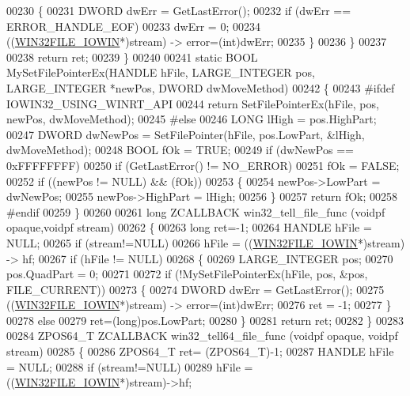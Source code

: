 \begin{DoxyCode}
00230         \{
00231             DWORD dwErr = GetLastError();
00232             \textcolor{keywordflow}{if} (dwErr == ERROR\_HANDLE\_EOF)
00233                 dwErr = 0;
00234             ((\hyperlink{struct_w_i_n32_f_i_l_e___i_o_w_i_n}{WIN32FILE\_IOWIN}*)stream) -> error=(int)dwErr;
00235         \}
00236     \}
00237 
00238     \textcolor{keywordflow}{return} ret;
00239 \}
00240 
00241 \textcolor{keyword}{static} BOOL MySetFilePointerEx(HANDLE hFile, LARGE\_INTEGER pos, LARGE\_INTEGER *newPos,  DWORD dwMoveMethod)
00242 \{
00243 \textcolor{preprocessor}{#ifdef IOWIN32\_USING\_WINRT\_API}
00244     \textcolor{keywordflow}{return} SetFilePointerEx(hFile, pos, newPos, dwMoveMethod);
00245 \textcolor{preprocessor}{#else}
00246     LONG lHigh = pos.HighPart;
00247     DWORD dwNewPos = SetFilePointer(hFile, pos.LowPart, &lHigh, dwMoveMethod);
00248     BOOL fOk = TRUE;
00249     \textcolor{keywordflow}{if} (dwNewPos == 0xFFFFFFFF)
00250         \textcolor{keywordflow}{if} (GetLastError() != NO\_ERROR)
00251             fOk = FALSE;
00252     \textcolor{keywordflow}{if} ((newPos != NULL) && (fOk))
00253     \{
00254         newPos->LowPart = dwNewPos;
00255         newPos->HighPart = lHigh;
00256     \}
00257     \textcolor{keywordflow}{return} fOk;
00258 \textcolor{preprocessor}{#endif}
00259 \}
00260 
00261 \textcolor{keywordtype}{long} ZCALLBACK win32\_tell\_file\_func (voidpf opaque,voidpf stream)
00262 \{
00263     \textcolor{keywordtype}{long} ret=-1;
00264     HANDLE hFile = NULL;
00265     \textcolor{keywordflow}{if} (stream!=NULL)
00266         hFile = ((\hyperlink{struct_w_i_n32_f_i_l_e___i_o_w_i_n}{WIN32FILE\_IOWIN}*)stream) -> hf;
00267     \textcolor{keywordflow}{if} (hFile != NULL)
00268     \{
00269         LARGE\_INTEGER pos;
00270         pos.QuadPart = 0;
00271 
00272         \textcolor{keywordflow}{if} (!MySetFilePointerEx(hFile, pos, &pos, FILE\_CURRENT))
00273         \{
00274             DWORD dwErr = GetLastError();
00275             ((\hyperlink{struct_w_i_n32_f_i_l_e___i_o_w_i_n}{WIN32FILE\_IOWIN}*)stream) -> error=(int)dwErr;
00276             ret = -1;
00277         \}
00278         \textcolor{keywordflow}{else}
00279             ret=(long)pos.LowPart;
00280     \}
00281     \textcolor{keywordflow}{return} ret;
00282 \}
00283 
00284 ZPOS64\_T ZCALLBACK win32\_tell64\_file\_func (voidpf opaque, voidpf stream)
00285 \{
00286     ZPOS64\_T ret= (ZPOS64\_T)-1;
00287     HANDLE hFile = NULL;
00288     \textcolor{keywordflow}{if} (stream!=NULL)
00289         hFile = ((\hyperlink{struct_w_i_n32_f_i_l_e___i_o_w_i_n}{WIN32FILE\_IOWIN}*)stream)->hf;

\end{DoxyCode}
